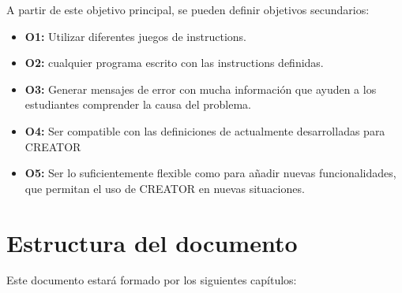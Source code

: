 \noindent
A partir de este objetivo principal, se pueden definir objetivos secundarios:

\begin{itemize}
    \item \textbf{O1:} Utilizar diferentes juegos de \glspl{instruction}.
    \item \textbf{O2:}  cualquier programa
     escrito con las \glspl{instruction}
    definidas.
    \item \textbf{O3:} Generar mensajes de error con mucha información que
    ayuden a los estudiantes comprender la causa del problema.
    \item \textbf{O4:} Ser compatible con las definiciones de
     actualmente desarrolladas para CREATOR
    \item \textbf{O5:} Ser lo suficientemente flexible como para añadir nuevas
    funcionalidades, que permitan el uso de CREATOR en nuevas situaciones.
\end{itemize}

\section{Estructura del documento}\label{sec:structure}

Este documento estará formado por los siguientes capítulos:


